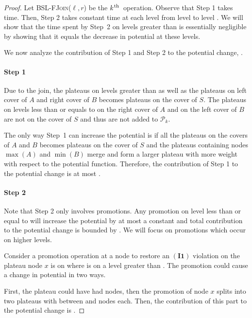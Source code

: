 \documentclass[11pt]{article}
\newcommand{\ens}[1]{\ensuremath{#1}}
\newcommand{\kth}{\ens{k^{ \mbox{\hspace{.2mm}\scriptsize th}}}}
\newcommand{\Bslfjoinx}[2]{\mbox{\textsc{BSL-FJoin(\ensuremath{#1,#2})}}}
\newcommand{\invone}{\ensuremath{\mathbf{(I1)}}}
\newcommand{\intmax}[1]{\ensuremath{\max(\intl #1)}}
\newcommand{\intmin}[1]{\ensuremath{\min(\intl #1)}}
\newcommand{\intl}[1]{\ensuremath{#1}}
\newcommand{\node}[1]{\ensuremath{#1}}
\newcommand{\bsl}[1]{\ensuremath{#1}}
\newcommand{\plats}[1]{\ensuremath{\mathcal P_{#1}}}
\begin{document}
\begin{proof} 
Let \Bslfjoinx{\ell}{r} be the \kth\ operation. Observe that Step 1 takes  time. 
Then, Step 2 takes constant time at each level from level  to level . We will show that the time spent by Step~2 on levels greater than  is essentially negligible by showing that it equals the decrease in potential at these levels. 

We now analyze the contribution of Step 1 and Step 2 to the potential change, . 

\paragraph{Step 1} 

Due to the join, the plateaus on levels greater than  as well as the plateaus on left cover of \bsl A and right cover of \bsl B becomes plateaus on the cover of \bsl S. The plateaus on levels less than or equals to  on the right cover of \bsl A and on the left cover of \bsl B are not on the cover of \bsl S and thus are not added to \plats k. 

The only way Step~1 can increase the potential is if all the plateaus on the covers of \bsl A and \bsl B becomes plateaus on the cover of \bsl S and the plateaus containing nodes \intmax A and \intmin B merge and form a larger plateau with more weight with respect to the potential function. 
Therefore, the contribution of Step 1 to the potential change is at most . 



\paragraph{Step 2} 

Note that Step 2 only involves promotions. Any promotion on level less than or equal to  will increase the potential by at most a constant and total contribution to the potential change is bounded by . We will focus on promotions which occur on higher levels. 

Consider a promotion operation at a node  to restore an \invone{} violation on the plateau  node \node x is on where  is on a level greater than . The promotion could cause a change in potential in two ways. 


First, the plateau  could have had  nodes, then the promotion of node \node x splits  into two plateaus with between  and  nodes each. Then, the contribution of this part to the potential change is . 



\end{proof}
\end{document}
